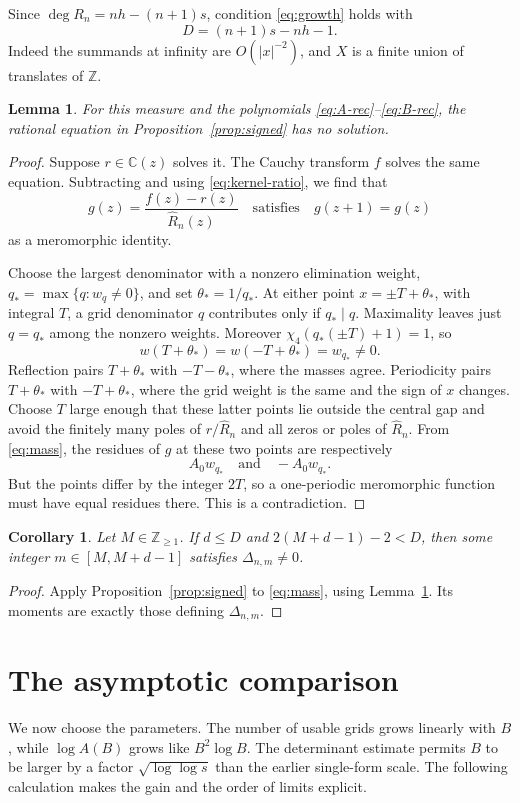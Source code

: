 \documentclass[11pt]{article}
\newtheorem{lemma}[theorem]{Lemma}
\newtheorem{corollary}[theorem]{Corollary}
\theoremstyle{remark}
\newcommand{\Z}{\mathbb Z}
\newcommand{\C}{\mathbb C}
\numberwithin{equation}{section}
\begin{document}
Since $\deg R_n=nh-(n+1)s$, condition \eqref{eq:growth} holds with
\begin{equation}\label{eq:moment-D}
 D=(n+1)s-nh-1.
\end{equation}
Indeed the summands at infinity are $O(|x|^{-2})$, and $X$ is a finite
union of translates of $\Z$.

\begin{lemma}\label{lem:no-rational}
For this measure and the polynomials \eqref{eq:A-rec}--\eqref{eq:B-rec},
the rational equation in Proposition~\ref{prop:signed} has no solution.
\end{lemma}
\begin{proof}
Suppose $r\in\C(z)$ solves it. The Cauchy transform $f$ solves the same
equation. Subtracting and using \eqref{eq:kernel-ratio}, we find that
\[
 g(z)=\frac{f(z)-r(z)}{\widehat R_n(z)}
 \quad\text{satisfies}\quad g(z+1)=g(z)
\]
as a meromorphic identity.

Choose the largest denominator with a nonzero elimination weight,
$q_* =\max\{q:w_q\ne0\}$, and set $\theta_*=1/q_*$. At either point
$x=\pm T+\theta_*$, with integral $T$, a grid denominator $q$ contributes
only if $q_*\mid q$. Maximality leaves just $q=q_*$ among the nonzero
weights. Moreover $\chi_4(q_*(\pm T)+1)=1$, so
\[
 w(T+\theta_*)=w(-T+\theta_*)=w_{q_*}\ne0.
\]
Reflection pairs $T+\theta_*$ with $-T-\theta_*$, where the masses
agree. Periodicity pairs $T+\theta_*$ with $-T+\theta_*$, where
the grid weight is the same and the sign of $x$ changes.
Choose $T$ large enough that these latter points lie outside the central gap
and avoid the finitely many poles of $r/\widehat R_n$ and all zeros
or poles of $\widehat R_n$. From \eqref{eq:mass}, the residues of $g$
at these two points are respectively
\[
 A_0w_{q_*}\quad\text{and}\quad -A_0w_{q_*}.
\]
But the points differ by the integer $2T$, so a one-periodic meromorphic
function must have equal residues there. This is a contradiction.
\end{proof}

\begin{corollary}\label{cor:nonzero}
Let $M\in\Z_{\geq1}$. If $d\leq D$ and $2(M+d-1)-2<D$, then some integer
$m\in[M,M+d-1]$ satisfies $\Delta_{n,m}\ne0$.
\end{corollary}
\begin{proof}
Apply Proposition~\ref{prop:signed} to \eqref{eq:mass}, using
Lemma~\ref{lem:no-rational}. Its moments are exactly those defining
$\Delta_{n,m}$.
\end{proof}
\section{The asymptotic comparison}\label{sec:finish}
We now choose the parameters. The number of usable grids grows linearly
with $B$, while $\log A(B)$ grows like $B^2\log B$. The determinant
estimate permits $B$ to be larger by a factor $\sqrt{\log\log s}$ than
the earlier single-form scale. The following calculation makes the gain
and the order of limits explicit.
\end{document}
